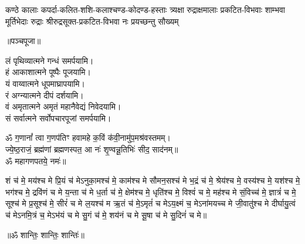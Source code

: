 {कण्ठे कालाः कपर्दा-कलित-शशि-कलाश्चण्ड-कोदण्ड-हस्ताः}
{त्र्यक्षा रुद्राक्षमालाः प्रकटित-विभवाः शाम्भवा मूर्तिभेदाः}
{रुद्राः श्रीरुद्रसूक्त-प्रकटित-विभवा नः प्रयच्छन्तु सौख्यम्}
\endgroup

\centerline{॥पञ्चपूजा॥}

लं पृथिव्यात्मने गन्धं समर्पयामि।\\
हं आकाशात्मने पूष्पैः पूजयामि।\\
यं वाय्वात्मने धूपमाघ्रापयामि।\\
रं अग्न्यात्मने दीपं दर्शयामि।\\
वं अमृतात्मने अमृतं महानैवेद्यं निवेदयामि।\\
सं सर्वात्मने सर्वोपचारपूजां समर्पयामि।

ॐ ग॒णानां᳚ त्वा ग॒णप॑तिꣳ हवामहे क॒विं क॑वी॒नामु॑प॒\-मश्र॑वस्तमम्।\\
ज्ये॒ष्ठ॒राजं॒ ब्रह्म॑णां ब्रह्मणस्पत॒ आ नः॑ शृ॒ण्वन्नू॒तिभिः॑ सीद॒ साद॑नम्॥\\
ॐ महागणपतये॒ नमः॑॥

शं च॑ मे॒ मय॑श्च मे प्रि॒यं च॑ मेऽनुका॒मश्च॑ मे॒ काम॑श्च मे सौमन॒सश्च॑ मे भ॒द्रं च॑ मे॒ श्रेय॑श्च मे॒ वस्य॑श्च मे॒ यश॑श्च मे॒ भग॑श्च मे॒ द्रवि॑णं च मे य॒न्ता च॑ मे ध॒र्ता च॑ मे॒ क्षेम॑श्च मे॒ धृति॑श्च मे॒ विश्वं॑ च मे॒ मह॑श्च मे सं॒विच्च॑ मे॒ ज्ञात्रं॑ च मे॒ सूश्च॑ मे प्र॒सूश्च॑ मे॒ सीरं॑ च मे ल॒यश्च॑ म ऋ॒तं च॑ मे॒ऽमृतं॑ च मेऽय॒क्ष्मं च॒ मेऽना॑मयच्च मे जी॒वातु॑श्च मे दीर्घायु॒त्वं च॑ मेऽनमि॒त्रं च॒ मेऽभ॑यं च मे सु॒गं च॑ मे॒ शय॑नं च मे सू॒षा च॑ मे सु॒दिनं॑ च मे॥
\centerline{॥ॐ शान्तिः॒ शान्तिः॒ शान्तिः॑॥}

\newcommand{\cham}[3]{\begin{center}
 \refstepcounter{cj}%
धूपम्। दीपम्। नैवेद्यम्। कर्पूरताम्बूलम्।\\
नीराजनम्—\\
#1\\
अनेन \textbf{#2}-वार-जपेन भगवान् सर्वात्मकः\\
\underline{\textbf{#3}} सुप्रीतः सुप्रसन्नो वरदो भवतु॥\devanumber{\arabic{cj}}॥

{\small\closesection}
\end{center}}

\newcommand{\rudram}[1]{\newpage\sect{रुद्रप्रश्नः}
\begin{center}

ॐ नमो भगवते॑ रुद्रा॒य॥\\
नम॑स्ते रुद्र म॒न्यव॑ उ॒तो त॒ इष॑वे॒ नमः॑।
% 
$\ldots$\\
#1\\
$\ldots$\\

त्र्य॑म्बकं यजामहे सुग॒न्धिं पु॑ष्टि॒वर्ध॑नम्।\\ उ॒र्वा॒रु॒कमि॑व॒ बन्ध॑नान्मृ॒त्योर्मु॑क्षीय॒ माऽमृता᳚त्॥
\end{center}
}

